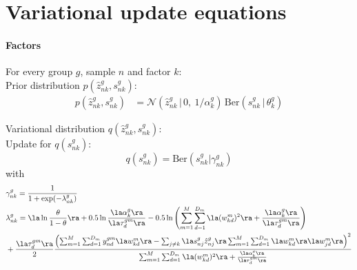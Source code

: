 \section{Variational update equations}

\paragraph*{Factors}

For every group $g$, sample $n$ and factor $k$: \\

Prior distribution $p(\hat{z}_{nk}^g,s_{nk}^g)$:
\begin{align}
	p(\hat{z}_{nk}^g,s_{nk}^g) &= \mathcal{N} (\hat{z}_{nk}^g \,|\, 0, ~ 1/\alpha_k^g)\, \text{Ber}(s_{nk}^g \,|\,\theta_k^g)
\end{align}

Variational distribution $q(\hat{z}_{nk}^g,s_{nk}^g)$:\\

Update for $q(s_{nk}^g)$:
\begin{equation}
	q(s^g_{nk}) = \mathrm{Ber}(s^g_{nk}|\gamma^g_{nk})
\end{equation}
with
\begin{equation} \begin{aligned}
	&\gamma^g_{nk} = \frac{1}{1+\exp(-\lambda_{nk}^g)}\\
	& \lambda_{nk}^g = \la \ln\frac{\theta}{1-\theta} \ra + 0.5\ln\frac{\la\alpha_k^g\ra}{\la\tau_d^{gm}\ra} - 0.5\ln\left( \sum_{m=1}^M\sum_{d=1}^{D_m} \la (w_{kd}^m)^2 \ra + \frac{\la\alpha_k^g\ra}{\la\tau_d^{gm}\ra} \right) \\
	&+ \frac{\la\tau_d^{gm}\ra}{2} \frac{ \left( \sum_{m=1}^M\sum_{d=1}^{D_m} y_{nd}^{gm} \la w^m_{kd} \ra - \sum_{j \neq k} \la s_{nj}^g\hat{z}_{nj}^g\ra \sum_{m=1}^M\sum_{d=1}^{D_m} \la w^m_{kd} \ra \la w^m_{jd} \ra \right)^2} {\sum_{m=1}^M\sum_{d=1}^{D_m} \la (w_{kd}^m)^2 \ra + \frac{\la\alpha_k^g\ra}{\la\tau_d^{gm}\ra} }
\end{aligned} \end{equation}

